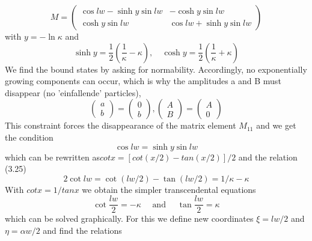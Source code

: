\begin{equation}
M=\left(\begin{array}{cc}{\cos l w-\sinh y \sin l w} & {-\cosh y \sin l w} \\ {\cosh y \sin l w} & {\cos l w+\sinh y \sin l w}\end{array}\right)
\end{equation}
with $y = - \operatorname{ln} \kappa$ and
\begin{equation}
    \sinh y=\frac{1}{2}\left(\frac{1}{\kappa}-\kappa\right), \quad \cosh y=\frac{1}{2}\left(\frac{1}{\kappa}+\kappa\right)
    \end{equation}
We find the bound states by asking for normability. Accordingly, no exponentially growing components can occur, which is why the amplitudes a and B must disappear (no 'einfallende' particles),
\begin{equation}
\left(\begin{array}{l}{a} \\ {b}\end{array}\right)=\left(\begin{array}{l}{0} \\ {b}\end{array}\right),\left(\begin{array}{c}{A} \\ {B}\end{array}\right)=\left(\begin{array}{c}{A} \\ {0}\end{array}\right)
\end{equation}
This constraint forces the disappearance of the matrix element $M_{11}$ and we get the condition
\begin{equation}
    \cos l w=\sinh y \sin l w
    \end{equation}
which can be rewritten as$ cot x = [cot (x / 2) - tan (x / 2)] / 2$ and the relation (3.25)
\begin{equation}
    2 \cot l w=\cot (l w / 2)-\tan (l w / 2)=1 / \kappa-\kappa
    \end{equation}
With $cot x = 1 / tan x$ we ​​obtain the simpler transcendental equations
\begin{equation}
    \cot \frac{l w}{2}=-\kappa \quad \text { and } \quad \tan \frac{l w}{2}=\kappa
    \end{equation}
which can be solved graphically. For this we define new coordinates $\xi = lw / 2$ and $\eta = \alpha w / 2$ and find the relations

